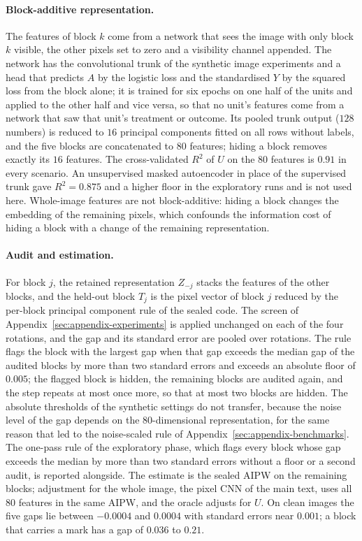 \paragraph{Block-additive representation.} The features of block $k$ come from a network that sees the image with only block $k$ visible, the other pixels set to zero and a visibility channel appended. The network has the convolutional trunk of the synthetic image experiments and a head that predicts $A$ by the logistic loss and the standardised $Y$ by the squared loss from the block alone; it is trained for six epochs on one half of the units and applied to the other half and vice versa, so that no unit's features come from a network that saw that unit's treatment or outcome. Its pooled trunk output ($128$ numbers) is reduced to $16$ principal components fitted on all rows without labels, and the five blocks are concatenated to $80$ features; hiding a block removes exactly its $16$ features. The cross-validated $R^2$ of $U$ on the $80$ features is $0.91$ in every scenario. An unsupervised masked autoencoder \citep{he2022masked} in place of the supervised trunk gave $R^2=0.875$ and a higher floor in the exploratory runs and is not used here. Whole-image features are not block-additive: hiding a block changes the embedding of the remaining pixels, which confounds the information cost of hiding a block with a change of the remaining representation.

\paragraph{Audit and estimation.} For block $j$, the retained representation $Z_{-j}$ stacks the features of the other blocks, and the held-out block $T_j$ is the pixel vector of block $j$ reduced by the per-block principal component rule of the sealed code. The screen of Appendix~\ref{sec:appendix-experiments} is applied unchanged on each of the four rotations, and the gap and its standard error are pooled over rotations. The rule flags the block with the largest gap when that gap exceeds the median gap of the audited blocks by more than two standard errors and exceeds an absolute floor of $0.005$; the flagged block is hidden, the remaining blocks are audited again, and the step repeats at most once more, so that at most two blocks are hidden. The absolute thresholds of the synthetic settings do not transfer, because the noise level of the gap depends on the $80$-dimensional representation, for the same reason that led to the noise-scaled rule of Appendix~\ref{sec:appendix-benchmarks}. The one-pass rule of the exploratory phase, which flags every block whose gap exceeds the median by more than two standard errors without a floor or a second audit, is reported alongside. The estimate is the sealed AIPW on the remaining blocks; adjustment for the whole image, the pixel CNN of the main text, uses all $80$ features in the same AIPW, and the oracle adjusts for $U$. On clean images the five gaps lie between $-0.0004$ and $0.0004$ with standard errors near $0.001$; a block that carries a mark has a gap of $0.036$ to $0.21$.


